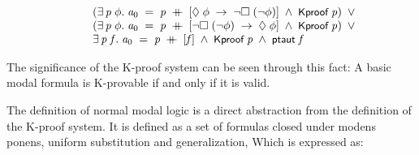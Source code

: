 \documentclass[letterpaper]{article}
\renewcommand{\HOLConst}[1]{{\textsf{\upshape\small #1}}}
\newenvironment{holmath}{\begin{displaymath}\begin{array}{l}}{\end{array}\end{displaymath}\ignorespacesafterend}
\begin{document}
\begin{holmath}
\;\;\;\;\;\;\;\;\;(\HOLSymConst{\HOLTokenExists{}}\HOLBoundVar{p}\;\HOLBoundVar{\ensuremath{\phi}}.\;\HOLFreeVar{a\sb{\mathrm{0}}}\;\HOLSymConst{=}\;\HOLBoundVar{p}\;\HOLSymConst{\HOLTokenDoublePlus}\;[\HOLSymConst{\ensuremath{\Diamond}}\;\HOLBoundVar{\ensuremath{\phi}}\;\HOLSymConst{\ensuremath{\rightarrow}}\;\HOLSymConst{\HOLTokenNeg{}}\HOLSymConst{\ensuremath{\Box}}\;(\HOLSymConst{\HOLTokenNeg{}}\HOLBoundVar{\ensuremath{\phi}})]\;\HOLSymConst{\HOLTokenConj{}}\;\HOLConst{Kproof}\;\HOLBoundVar{p})\;\HOLSymConst{\HOLTokenDisj{}}\\
\;\;\;\;\;\;\;\;\;(\HOLSymConst{\HOLTokenExists{}}\HOLBoundVar{p}\;\HOLBoundVar{\ensuremath{\phi}}.\;\HOLFreeVar{a\sb{\mathrm{0}}}\;\HOLSymConst{=}\;\HOLBoundVar{p}\;\HOLSymConst{\HOLTokenDoublePlus}\;[\HOLSymConst{\HOLTokenNeg{}}\HOLSymConst{\ensuremath{\Box}}\;(\HOLSymConst{\HOLTokenNeg{}}\HOLBoundVar{\ensuremath{\phi}})\;\HOLSymConst{\ensuremath{\rightarrow}}\;\HOLSymConst{\ensuremath{\Diamond}}\;\HOLBoundVar{\ensuremath{\phi}}]\;\HOLSymConst{\HOLTokenConj{}}\;\HOLConst{Kproof}\;\HOLBoundVar{p})\;\HOLSymConst{\HOLTokenDisj{}}\\
\;\;\;\;\;\;\;\;\;\HOLSymConst{\HOLTokenExists{}}\HOLBoundVar{p}\;\HOLBoundVar{f}.\;\HOLFreeVar{a\sb{\mathrm{0}}}\;\HOLSymConst{=}\;\HOLBoundVar{p}\;\HOLSymConst{\HOLTokenDoublePlus}\;[\HOLBoundVar{f}]\;\HOLSymConst{\HOLTokenConj{}}\;\HOLConst{Kproof}\;\HOLBoundVar{p}\;\HOLSymConst{\HOLTokenConj{}}\;\HOLConst{ptaut}\;\HOLBoundVar{f}
\end{holmath}

The significance of the K-proof system can be seen through this fact: A basic modal formula is K-provable if and only if it is valid.

The definition of normal modal logic is a direct abstraction from the definition of the K-proof system. It is defined as a set of formulas closed under modens ponens, uniform substitution and generalization, Which is expressed as:
\end{document}
